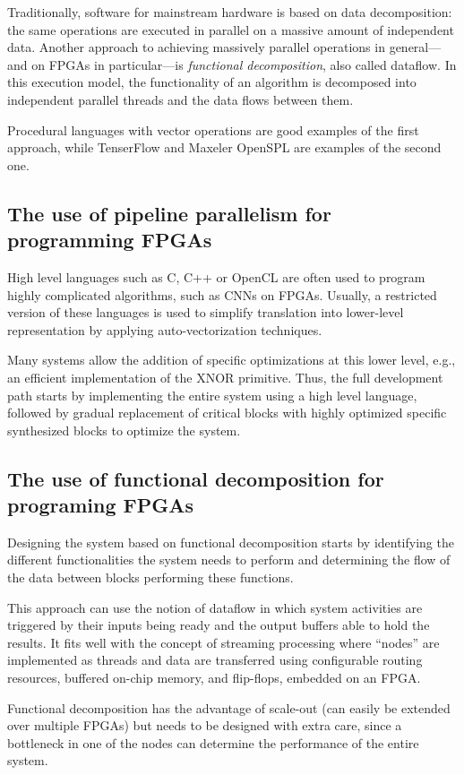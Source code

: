 \documentclass[conference]{IEEEtran}
\begin{document}
	Traditionally, software for mainstream hardware is based on data decomposition: the same operations are executed in parallel on a massive amount of independent data. Another approach to achieving massively parallel operations in general---and on FPGAs in particular---is {\it functional decomposition}, also called dataflow. In this execution model, the functionality of an algorithm is decomposed into independent parallel threads and the data flows between them.
	
	Procedural languages with vector operations are good examples of the first approach, while TenserFlow and Maxeler OpenSPL are examples of the second one.
	
	\subsection {The use of pipeline parallelism for programming FPGAs}
	High level languages such as C, C++ or OpenCL are often used to program highly complicated algorithms, such as CNNs on FPGAs. Usually, a restricted version of these languages is used to simplify translation into lower-level representation by applying auto-vectorization techniques.
	
	Many systems allow the addition of specific optimizations at this lower level, e.g., an efficient implementation of the XNOR primitive. Thus, the full development path starts by implementing the entire system using a high level language, followed by gradual replacement of critical blocks with highly optimized specific synthesized blocks to optimize the system.
	\subsection {The use of functional decomposition for programing FPGAs }
	
	Designing the system based on functional decomposition starts by identifying the different functionalities the system needs to perform and determining the flow of the data between blocks performing these functions. 
	
	This approach can use the notion of dataflow in which system activities are triggered by their inputs being ready and the output buffers able to hold the results. It fits well with the concept of streaming processing where ``nodes'' are implemented as threads and data are transferred using configurable routing resources, buffered on-chip memory, and flip-flops, embedded on an FPGA.
	
	Functional decomposition has the advantage of scale-out (can easily be extended over multiple FPGAs) but needs to be designed with extra care, since a bottleneck in one of the nodes can determine the performance of the entire system.
	
\end{document}
